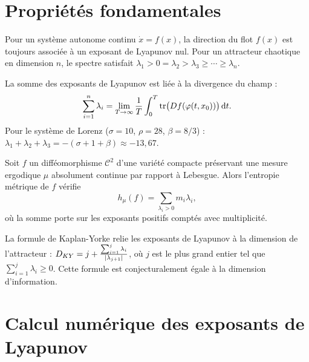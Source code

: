 \section{Propri\'et\'es fondamentales}

\begin{proposition}
Pour un syst\`eme autonome continu $\dot{x} = f(x)$, la direction du flot
$f(x)$ est toujours associ\'ee \`a un exposant de Lyapunov nul. Pour un
attracteur chaotique en dimension $n$, le spectre satisfait
$\lambda_1 > 0 = \lambda_2 > \lambda_3 \geq \cdots \geq \lambda_n$.
\end{proposition}

\begin{proposition}
\label{prop:liouville}
La somme des exposants de Lyapunov est li\'ee \`a la divergence du champ :
\[
    \sum_{i=1}^{n} \lambda_i = \lim_{T \to \infty} \frac{1}{T}
    \int_0^T \mathrm{tr}\bigl(Df(\varphi(t, x_0))\bigr) \, \mathrm{d}t.
\]
Pour le syst\`eme de Lorenz ($\sigma = 10$, $\rho = 28$, $\beta = 8/3$) :
$\lambda_1 + \lambda_2 + \lambda_3 = -(\sigma + 1 + \beta) \approx -13{,}67$.
\end{proposition}

\begin{theoreme}
Soit $f$ un diff\'eomorphisme $\mathcal{C}^2$ d'une vari\'et\'e compacte
pr\'eservant une mesure ergodique $\mu$ absolument continue par rapport \`a
Lebesgue. Alors l'entropie m\'etrique de $f$ v\'erifie
\[
    h_\mu(f) = \sum_{\lambda_i > 0} m_i \lambda_i,
\]
o\`u la somme porte sur les exposants positifs compt\'es avec multiplicit\'e.
\end{theoreme}

\begin{attention}[title=\textbf{Exposants et dimension}]
La formule de Kaplan-Yorke relie les exposants de Lyapunov \`a la dimension
de l'attracteur : $D_{KY} = j + \frac{\sum_{i=1}^{j} \lambda_i}{\left| \lambda_{j+1} \right|}$,
o\`u $j$ est le plus grand entier tel que $\sum_{i=1}^{j} \lambda_i \geq 0$.
Cette formule est conjecturalement \'egale \`a la dimension d'information.
\end{attention}

\section{Calcul num\'erique des exposants de Lyapunov}

